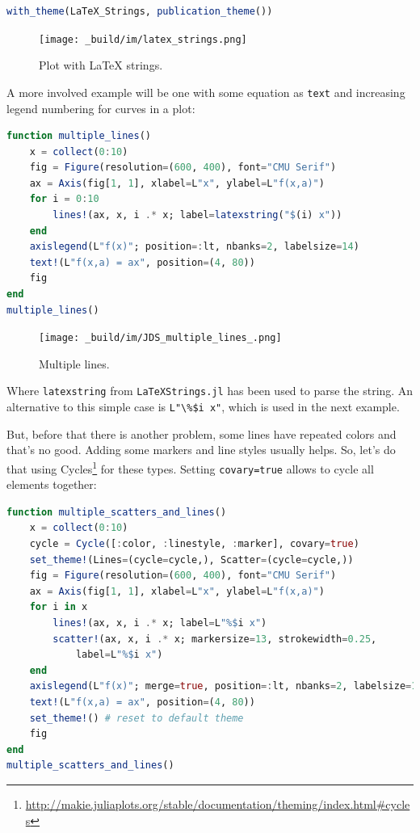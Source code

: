 \documentclass[
  notoc %
]{tufte-book}
\DeclareRobustCommand{\href}[2]{#2\footnote{\url{#1}}}
\newcommand{\passthrough}[1]{#1}
\begin{document}
\begin{lstlisting}[language=Julia]
with_theme(LaTeX_Strings, publication_theme())
\end{lstlisting}

\begin{figure}
\hypertarget{fig:latex_strings}{%
\centering
\texttt{[image: \_build/im/latex\_strings.png]}
\caption{Plot with LaTeX strings.}\label{fig:latex_strings}
}
\end{figure}

A more involved example will be one with some equation as
\passthrough{\lstinline!text!} and increasing legend numbering for
curves in a plot:

\begin{lstlisting}[language=Julia]
function multiple_lines()
    x = collect(0:10)
    fig = Figure(resolution=(600, 400), font="CMU Serif")
    ax = Axis(fig[1, 1], xlabel=L"x", ylabel=L"f(x,a)")
    for i = 0:10
        lines!(ax, x, i .* x; label=latexstring("$(i) x"))
    end
    axislegend(L"f(x)"; position=:lt, nbanks=2, labelsize=14)
    text!(L"f(x,a) = ax", position=(4, 80))
    fig
end
multiple_lines()
\end{lstlisting}

\begin{figure}
\hypertarget{fig:multiple_lines}{%
\centering
\texttt{[image: \_build/im/JDS\_multiple\_lines\_.png]}
\caption{Multiple lines.}\label{fig:multiple_lines}
}
\end{figure}

Where \passthrough{\lstinline!latexstring!} from
\passthrough{\lstinline!LaTeXStrings.jl!} has been used to parse the
string. An alternative to this simple case is
\passthrough{\lstinline!L"\%$i x"!}, which is used in the next example.

But, before that there is another problem, some lines have repeated
colors and that's no good. Adding some markers and line styles usually
helps. So, let's do that using
\href{http://makie.juliaplots.org/stable/documentation/theming/index.html\#cycles}{Cycles}
for these types. Setting \passthrough{\lstinline!covary=true!} allows to
cycle all elements together:

\begin{lstlisting}[language=Julia]
function multiple_scatters_and_lines()
    x = collect(0:10)
    cycle = Cycle([:color, :linestyle, :marker], covary=true)
    set_theme!(Lines=(cycle=cycle,), Scatter=(cycle=cycle,))
    fig = Figure(resolution=(600, 400), font="CMU Serif")
    ax = Axis(fig[1, 1], xlabel=L"x", ylabel=L"f(x,a)")
    for i in x
        lines!(ax, x, i .* x; label=L"%$i x")
        scatter!(ax, x, i .* x; markersize=13, strokewidth=0.25,
            label=L"%$i x")
    end
    axislegend(L"f(x)"; merge=true, position=:lt, nbanks=2, labelsize=14)
    text!(L"f(x,a) = ax", position=(4, 80))
    set_theme!() # reset to default theme
    fig
end
multiple_scatters_and_lines()
\end{lstlisting}
\end{document}
